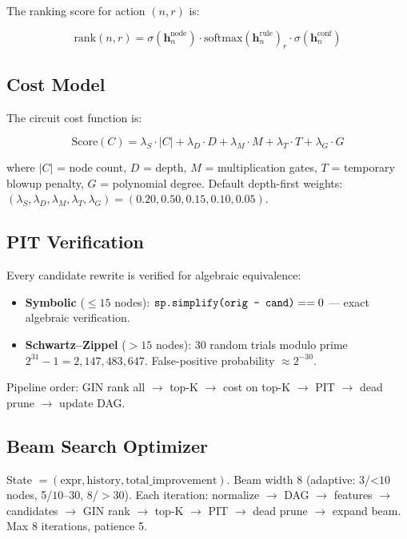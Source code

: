 \documentclass[10pt]{article}
\begin{document}
The ranking score for action $(n, r)$ is:

$$\text{rank}(n,r) = \sigma(\mathbf{h}_n^{\text{node}}) \cdot
\text{softmax}(\mathbf{h}_n^{\text{rule}})_r \cdot
\sigma(\mathbf{h}_n^{\text{conf}})$$

\subsection{Cost Model}

The circuit cost function is:

$$\text{Score}(C) = \lambda_S \cdot |C| + \lambda_D \cdot D +
\lambda_M \cdot M + \lambda_T \cdot T + \lambda_G \cdot G$$

where $|C|$ = node count, $D$ = depth, $M$ = multiplication gates, $T$ =
temporary blowup penalty, $G$ = polynomial degree. Default depth-first weights:
$(\lambda_S, \lambda_D, \lambda_M, \lambda_T, \lambda_G) = (0.20, 0.50, 0.15,
0.10, 0.05)$.

\subsection{PIT Verification}

Every candidate rewrite is verified for algebraic equivalence:

\begin{itemize}
    \item \textbf{Symbolic} ($\leq 15$ nodes): $\text{\texttt{sp.simplify(orig -
          cand)}} == 0$ — exact algebraic verification.
    \item \textbf{Schwartz–Zippel} ($> 15$ nodes): 30 random trials modulo
          prime $2^{31}-1 = 2,147,483,647$. False-positive probability
          $\approx 2^{-30}$.
\end{itemize}

Pipeline order: GIN rank all $\rightarrow$ top-K $\rightarrow$ cost on top-K
$\rightarrow$ PIT $\rightarrow$ dead prune $\rightarrow$ update DAG.

\subsection{Beam Search Optimizer}

State $= (\text{expr}, \text{history}, \text{total\_improvement})$. Beam width
8 (adaptive: 3/<$10$ nodes, 5/$10$–$30$, 8/$>$$30$). Each iteration:
normalize $\rightarrow$ DAG $\rightarrow$ features $\rightarrow$ candidates
$\rightarrow$ GIN rank $\rightarrow$ top-K $\rightarrow$ PIT $\rightarrow$
dead prune $\rightarrow$ expand beam. Max 8 iterations, patience 5.
\end{document}
